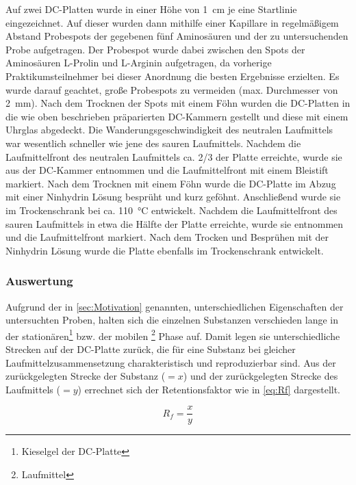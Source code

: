\documentclass{article}
\begin{document}
        Auf zwei DC-Platten wurde in einer Höhe von \SI[mode=text]{1}{\centi\meter} je eine Startlinie eingezeichnet. Auf dieser wurden dann mithilfe einer Kapillare in regelmäßigem Abstand Probespots der gegebenen fünf Aminosäuren und der zu untersuchenden Probe aufgetragen. Der Probespot wurde dabei zwischen den Spots der Aminosäuren L-Prolin und L-Arginin aufgetragen, da vorherige Praktikumsteilnehmer bei dieser Anordnung die besten Ergebnisse erzielten. Es wurde darauf geachtet, große Probespots zu vermeiden (max. Durchmesser von \SI[mode=text]{2}{\milli\meter}). Nach dem Trocknen der Spots mit einem Föhn wurden die DC-Platten in die wie oben beschrieben präparierten DC-Kammern gestellt und diese mit einem Uhrglas abgedeckt. Die Wanderungsgeschwindigkeit des neutralen Laufmittels war wesentlich schneller wie jene des sauren Laufmittels. Nachdem die Laufmittelfront des neutralen Laufmittels ca. 2/3 der Platte erreichte, wurde sie aus der DC-Kammer entnommen und die Laufmittelfront mit einem Bleistift markiert. Nach dem Trocknen mit einem Föhn wurde die DC-Platte im Abzug mit einer Ninhydrin Lösung besprüht und kurz geföhnt. Anschließend wurde sie im Trockenschrank bei ca. \SI[mode=text]{110}{\degreeCelsius} entwickelt. Nachdem die Laufmittelfront des sauren Laufmittels in etwa die Hälfte der Platte erreichte, wurde sie entnommen und die Laufmittelfront markiert. Nach dem Trocken und Besprühen mit der Ninhydrin Lösung wurde die Platte ebenfalls im Trockenschrank entwickelt.
    
      \subsubsection{Auswertung}
    
        Aufgrund der in \ref{sec:Motivation} genannten, unterschiedlichen Eigenschaften der untersuchten Proben, halten sich die einzelnen Substanzen verschieden lange in der stationären\footnote{Kieselgel der DC-Platte} bzw. der mobilen \footnote{Laufmittel} Phase auf. Damit legen sie unterschiedliche Strecken auf der DC-Platte zurück, die für eine Substanz bei gleicher Laufmittelzusammensetzung charakteristisch und reproduzierbar sind. Aus der zurückgelegten Strecke der Substanz ($= x$) und der zurückgelegten Strecke des Laufmittels ($= y$) errechnet sich der Retentionsfaktor wie in \eqref{eq:Rf} dargestellt.
    
        \begin{equation}
          R_{f} = \frac{x}{y} \label{eq:Rf}
        \end{equation}
        
\end{document}
